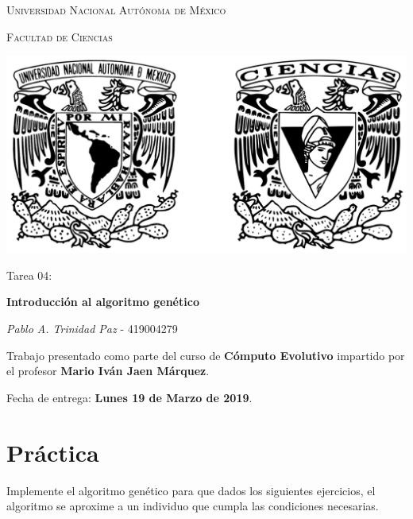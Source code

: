 \documentclass[10pt,letterpaper]{article}
\begin{document}
\begin{titlepage}
    \centering

    {\scshape\LARGE Universidad Nacional Autónoma de México \par}

    \vspace{1cm}
    {\scshape\Large Facultad de Ciencias\par}
    \vspace{1.5cm}

    \begin{center}
        \includegraphics[scale=.1]{../../assets/img/logo.png}
    \end{center}

    \vspace{.8 cm}

    {\LARGE Tarea 04: \par}
    {\huge\bfseries Introducción al algoritmo genético \par}

    \vspace{0.5cm}
    \large{\itshape{Pablo A. Trinidad Paz}} \small{ - 419004279}

    \vfill

    Trabajo presentado como parte del curso de
    \textbf{Cómputo Evolutivo}
    impartido por el profesor \textbf{Mario Iván Jaen Márquez}. \par
    \vspace{0.5cm}
    Fecha de entrega: \textbf{Lunes 19 de Marzo de 2019}.
\end{titlepage}

\section{Práctica}
Implemente el algoritmo genético para que dados los siguientes ejercicios,
el algoritmo se aproxime a un individuo que cumpla las condiciones necesarias.
\end{document}
